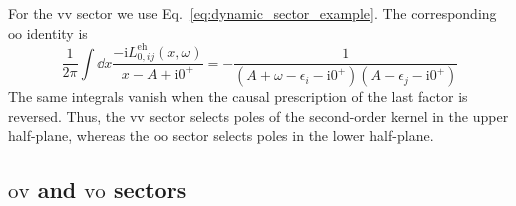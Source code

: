 \documentclass[aip,jcp,reprint,noshowkeys,superscriptaddress]{revtex4-1}
\newcommand{\eps}{\epsilon}
\newcommand{\ii}{\mathrm{i}}
\newcommand{\eh}{\text{eh}}
\begin{document}
For the $\text{vv}$ sector we use Eq.~\eqref{eq:dynamic_sector_example}.
The corresponding $\text{oo}$ identity is
\begin{equation}
    \frac{1}{2\pi}\int\dd{x}
    \frac{-\ii L_{0,ij}^{\eh}(x,\omega)}{x-A+\ii0^+}
    =-\frac{1}{(A+\omega-\eps_i-\ii0^+)(A-\eps_j-\ii0^+)}
    \label{eq:oo_elementary_contour}
\end{equation}
The same integrals vanish when the causal prescription of the last factor is
reversed.  Thus, the $\text{vv}$ sector selects poles of the second-order kernel
in the upper half-plane, whereas the $\text{oo}$ sector selects poles in the
lower half-plane.  

\subsection{$\text{ov}$ and $\text{vo}$ sectors}
\end{document}
